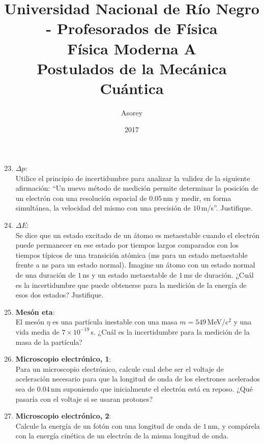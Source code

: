 \documentclass[a4paper,12pt]{article}
\begin{document}
\title{
{\normalsize{Universidad Nacional de Río Negro - Profesorados de Física}}\\
Física Moderna A \\ Postulados de la Mecánica Cuántica\\}
\author{Asorey}
\date{2017}
\maketitle

\begin{enumerate}
\setcounter{enumi}{22}      %


\item {\bf{$\Delta p$}}:\\
	Utilice el principio de incertidumbre para analizar la validez de la siguiente
		afirmación: ``Un nuevo método de medición permite determinar la
		posición de un electrón con una resolución espacial de $0.05$\,nm y
		medir, en forma simultánea, la velocidad del mismo con una precisión de
		$10$\,m/s''. Justifique.

\item{\bf{$\Delta E$}}:\\
	Se dice que un estado excitado de un átomo es metaestable cuando el
		electrón puede permanecer en ese estado por tiempos largos comparados
		con los tiempos típicos de una transición atómica (ms para un estado
		metaestable frente a ns para un estado normal). Imagine un átomo con un
		estado normal de una duración de $1$\,ns y un estado metaestable de
		$1$\,ms de duración. ¿Cuál es la incertidumbre que puede obtenerse para
		la medición de la energía de esos dos estados? Justifique.		

\item {\bf{Mesón eta}}:\\
	El mesón $\eta$ es una partícula inestable con una masa $m=549$\,MeV/c$^2$
		y una vida media de $7\times 10^{-19}$\,s. ¿Cuál es la incertidumbre
		para la medición de la masa de la partícula?

\item{\bf{Microscopio electrónico, 1}}:\\
	Para un microscopio electrónico, calcule cual debe ser el voltaje de
		aceleración necesario para que la longitud de onda de los electrones
		acelerados sea de $0.04$\,nm suponiendo que inicialmente el electrón
		está en reposo. ¿Qué pasaría con el voltaje si se usaran protones?

\item{\bf{Microscopio electrónico, 2}}:\\
	Calcule la energía de un fotón con una longitud de onda de $1$\,nm, y
		compárela con la energía cinética de un electrón de la misma longitud
		de onda.


\end{enumerate}
\end{document}
